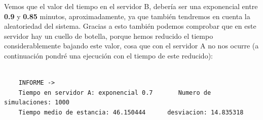 \documentclass[11pt,a4paper]{article}
\begin{document}
Vemos que el valor del tiempo en el servidor B, debería ser una exponencial entre \textbf{0.9} y \textbf{0.85} minutos, aproximadamente, ya que también
tendremos en cuenta la aleatoriedad del sistema. Gracias a esto también podemos comprobar que en este servidor hay un cuello de botella, porque hemos
reducido el tiempo considerablemente bajando este valor, cosa que con el servidor A no nos ocurre (a continuación pondré una ejecución con el tiempo de
este reducido):

\begin{lstlisting}
	
	INFORME ->
	Tiempo en servidor A: exponencial 0.7		Numero de simulaciones: 1000
	Tiempo medio de estancia: 46.150444      desviacion: 14.835318
	
\end{lstlisting}
\end{document}
